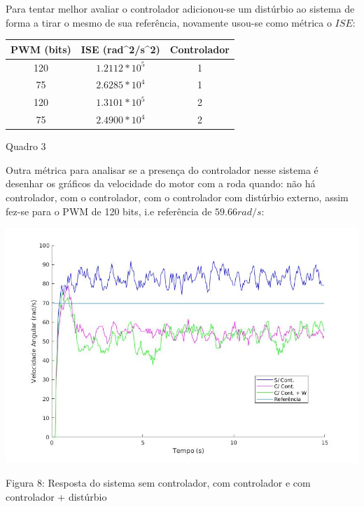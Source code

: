 \documentclass{article}
\begin{document}
Para tentar melhor avaliar o controlador adicionou-se um distúrbio ao sistema de forma a tirar o mesmo de sua referência, novamente usou-se como métrica o $ISE$:

\begin{center}
    \begin{tabular}{|c|c|c|}
            \hline
            PWM (bits) & ISE (rad^2/s^2) & Controlador \\
            \hline
            120 & $1.2112*10^5$ & 1 \\
            \hline
            75 & $2.6285*10^4$ & 1\\
            \hline
            120 & $1.3101*10^5$ & 2\\
            \hline
            75 & $2.4900*10^4$ & 2\\
            \hline
    \end{tabular}
    
  \caption{Quadro 3}
\end{center}

Outra métrica para analisar se a presença do controlador nesse sistema é desenhar os gráficos da velocidade do motor com a roda quando: não há controlador, com o controlador, com o controlador com distúrbio externo, assim fez-se para o PWM de 120 bits, i.e referência de $59.66rad/s$:

\begin{center}
    \centering
        \includegraphics[scale=0.5]{imagens/pwm120.jpg}
        
        \caption{Figura 8: Resposta do sistema sem controlador, com controlador e com controlador + distúrbio }
\end{center}
\end{document}
